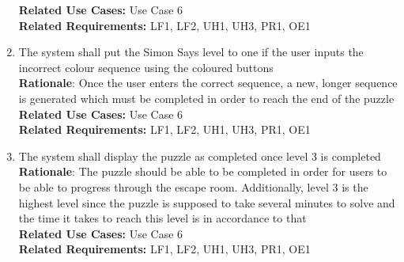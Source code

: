 \documentclass[12pt]{article}
\begin{document}
\begin{enumerate}[label=SS\arabic*., series=SimonSays]
        \textbf{Related Use Cases:} Use Case 6\\
        \textbf{Related Requirements:} LF1, LF2, UH1, UH3, PR1, OE1
        \item The system shall put the Simon Says level to one if the user inputs the incorrect colour sequence using the coloured buttons\\
        \textbf{Rationale}: Once the user enters the correct sequence, a new, longer sequence is generated which must be completed in order to reach the end of the puzzle\\
        \textbf{Related Use Cases:} Use Case 6\\
        \textbf{Related Requirements:} LF1, LF2, UH1, UH3, PR1, OE1
        \item The system shall display the puzzle as completed once level 3 is completed\\
        \textbf{Rationale}: The puzzle should be able to be completed in order for users to be able to progress through the escape room. Additionally, level 3 is the highest level since the puzzle is supposed to take several minutes to solve and the time it takes to reach this level is in accordance to that\\
        \textbf{Related Use Cases:} Use Case 6\\
        \textbf{Related Requirements:} LF1, LF2, UH1, UH3, PR1, OE1
    \end{enumerate}
\end{document}

